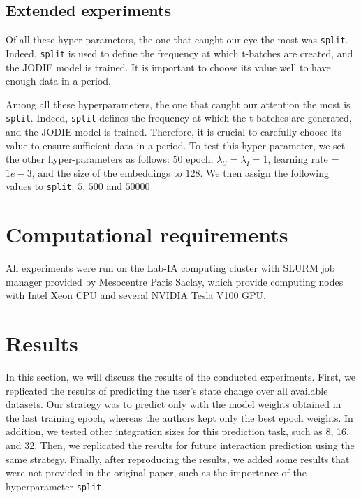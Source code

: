 \subsection{Extended experiments}


Of all these hyper-parameters, the one that caught our eye the most was \texttt{split}. Indeed, \texttt{split} is used to define the frequency at which t-batches are created, and the JODIE model is trained. It is important to choose its value well to have enough data in a period. 

Among all these hyperparameters, the one that caught our attention the most is \texttt{split}. Indeed, \texttt{split} defines the frequency at which the t-batches are generated, and the JODIE model is trained. Therefore, it is crucial to carefully choose its value to ensure sufficient data in a period. To test this hyper-parameter, we set the other hyper-parameters as follows:
$50$ epoch, $\lambda_U = \lambda_I = 1$, learning rate = $1e-3$, and the size of the embeddings to $128$. We then assign the following values to \texttt{split}: $5$, $500$ and $50000$

\section{Computational requirements}
All experiments were run on the Lab-IA\footnotemark[6] computing cluster with SLURM job manager provided by Mesocentre Paris Saclay\footnotemark[7], which provide computing nodes with Intel Xeon CPU and several NVIDIA Tesla V100 GPU.



\section{Results}
In this section, we will discuss the results of the conducted experiments. First, we replicated the results of predicting the user's state change over all available datasets. Our strategy was to predict only with the model weights obtained in the last training epoch, whereas the authors kept only the best epoch weights. In addition, we tested other integration sizes for this prediction task, such as 8, 16, and 32. Then, we replicated the results for future interaction prediction using the same strategy. Finally, after reproducing the results, we added some results that were not provided in the original paper, such as the importance of the hyperparameter \texttt{split}.

